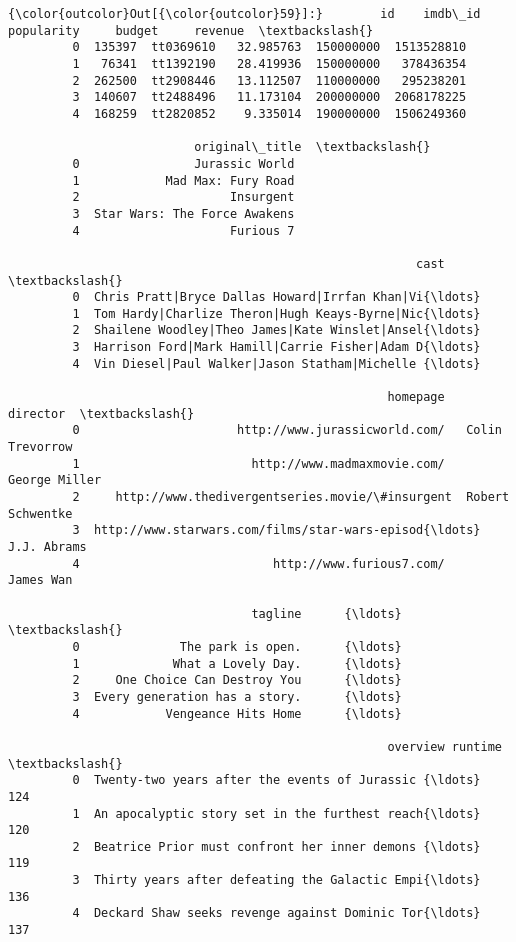 \documentclass[11pt]{article}
\begin{document}
\begin{Verbatim}[commandchars=\\\{\}]
{\color{outcolor}Out[{\color{outcolor}59}]:}        id    imdb\_id  popularity     budget     revenue  \textbackslash{}
         0  135397  tt0369610   32.985763  150000000  1513528810   
         1   76341  tt1392190   28.419936  150000000   378436354   
         2  262500  tt2908446   13.112507  110000000   295238201   
         3  140607  tt2488496   11.173104  200000000  2068178225   
         4  168259  tt2820852    9.335014  190000000  1506249360   
         
                          original\_title  \textbackslash{}
         0                Jurassic World   
         1            Mad Max: Fury Road   
         2                     Insurgent   
         3  Star Wars: The Force Awakens   
         4                     Furious 7   
         
                                                         cast  \textbackslash{}
         0  Chris Pratt|Bryce Dallas Howard|Irrfan Khan|Vi{\ldots}   
         1  Tom Hardy|Charlize Theron|Hugh Keays-Byrne|Nic{\ldots}   
         2  Shailene Woodley|Theo James|Kate Winslet|Ansel{\ldots}   
         3  Harrison Ford|Mark Hamill|Carrie Fisher|Adam D{\ldots}   
         4  Vin Diesel|Paul Walker|Jason Statham|Michelle {\ldots}   
         
                                                     homepage          director  \textbackslash{}
         0                      http://www.jurassicworld.com/   Colin Trevorrow   
         1                        http://www.madmaxmovie.com/     George Miller   
         2     http://www.thedivergentseries.movie/\#insurgent  Robert Schwentke   
         3  http://www.starwars.com/films/star-wars-episod{\ldots}       J.J. Abrams   
         4                           http://www.furious7.com/         James Wan   
         
                                  tagline      {\ldots}       \textbackslash{}
         0              The park is open.      {\ldots}        
         1             What a Lovely Day.      {\ldots}        
         2     One Choice Can Destroy You      {\ldots}        
         3  Every generation has a story.      {\ldots}        
         4            Vengeance Hits Home      {\ldots}        
         
                                                     overview runtime  \textbackslash{}
         0  Twenty-two years after the events of Jurassic {\ldots}     124   
         1  An apocalyptic story set in the furthest reach{\ldots}     120   
         2  Beatrice Prior must confront her inner demons {\ldots}     119   
         3  Thirty years after defeating the Galactic Empi{\ldots}     136   
         4  Deckard Shaw seeks revenge against Dominic Tor{\ldots}     137   
         

\end{Verbatim}
\end{document}
